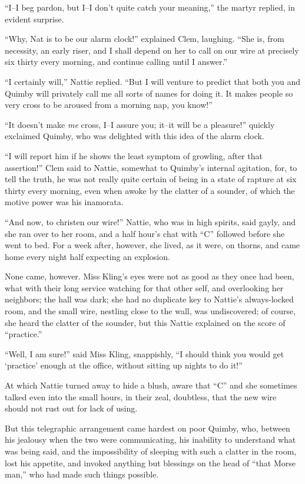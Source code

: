 ``I--I beg pardon, but I--I don't quite catch your meaning,'' the martyr
replied, in evident surprise.

``Why, Nat is to be our alarm clock!'' explained Clem, laughing. ``She is,
from necessity, an early riser, and I shall depend on her to call on our
wire at precisely six thirty every morning, and continue calling until I
answer.''

``I certainly will,'' Nattie replied. ``But I will venture to predict that
both you and Quimby will privately call me all sorts of names for doing
it. It makes people so very cross to be aroused from a morning nap, you
know!''

``It doesn't make \emph{me} cross, I--I assure you; it--it will be a pleasure!''
quickly exclaimed Quimby, who was delighted with this idea of the alarm
clock.

``I will report him if he shows the least symptom of growling, after that
assertion!'' Clem said to Nattie, somewhat to Quimby's internal
agitation, for, to tell the truth, he was not really quite certain of
being in a state of rapture at six thirty every morning, even when awoke
by the clatter of a sounder, of which the motive power was his
inamorata.

``And now, to christen our wire!'' Nattie, who was in high spirits, said
gayly, and she ran over to her room, and a half hour's chat with ``C''
followed before she went to bed. For a week after, however, she lived,
as it were, on thorns, and came home every night half expecting an
explosion.

None came, however. Miss Kling's eyes were not as good as they once had
been, what with their long service watching for that other self, and
overlooking her neighbors; the hall was dark; she had no duplicate key
to Nattie's always-locked room, and the small wire, nestling close to
the wall, was undiscovered; of course, she heard the clatter of the
sounder, but this Nattie explained on the score of ``practice.''

``Well, I am sure!'' said Miss Kling, snappishly, ``I should think you
would get `practice' enough at the office, without sitting up nights to
do it!''

At which Nattie turned away to hide a blush, aware that ``C'' and she
sometimes talked even into the small hours, in their zeal, doubtless,
that the new wire should not rust out for lack of using.

But this telegraphic arrangement came hardest on poor Quimby, who,
between his jealousy when the two were communicating, his inability to
understand what was being said, and the impossibility of sleeping with
such a clatter in the room, lost his appetite, and invoked anything but
blessings on the head of ``that Morse man,'' who had made such things
possible.

